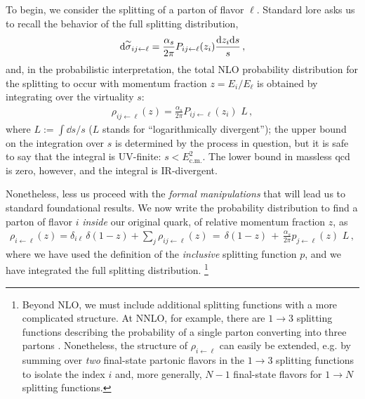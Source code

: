To begin, we consider the splitting of a parton of flavor \(\ell\).
%
Standard lore asks us to recall the behavior of the full splitting distribution,
\begin{align}
    \dd\overset{\sim}{\sigma}_{ij \leftarrow \ell}
    =
    \frac{\alpha_s}{2\pi}
    P_{ij \leftarrow \ell}(z_i) \frac{\dd z_i \dd s}{s}
    \,,
\end{align}
and, in the probabilistic interpretation, the total NLO probability distribution for the splitting to occur with momentum fraction \(z = E_i/E_\ell\) is obtained by integrating over the virtuality \(s\):
\begin{align}
    \rho_{ij \leftarrow \ell}(z)
    =
    \frac{\alpha_s}{2\pi}
    P_{ij \leftarrow \ell}(z_i)
    \,\,
    L
    \,,
\end{align}
where \(L := \int \dd s / s\) (\(L\) stands for ``logarithmically divergent'');
%
the upper bound on the integration over \(s\) is determined by the process in question, but it is safe to say that the integral is UV-finite:
%
\(s < E_\text{c.m.}^2\).
%
The lower bound in massless \gls{qcd} is zero, however, and the integral is IR-divergent.


Nonetheless, less us proceed with the \emph{formal manipulations} that will lead us to standard foundational results.
%
We now write the probability distribution to find a parton of flavor \(i\) \textit{inside} our original quark, of relative momentum fraction \(z\), as
\begin{align}
    \rho_{i \leftarrow \ell}(z)
    =
    \delta_{i\ell}
    \,
    \delta(1-z) + \sum_j \rho_{ij \leftarrow \ell}(z)
    \,
    =
    \,
    \delta(1-z)
    \,
    +
    \,
    \frac{\alpha_s}{2\pi}
    p_{j\leftarrow \ell}(z)
    \,\,
    L
    \,,
\end{align}
where we have used the definition of the \textit{inclusive} splitting function \(p\), and we have integrated the full splitting distribution.%
\footnote{
    Beyond NLO, we must include additional splitting functions with a more complicated structure.
    At NNLO, for example, there are \(1 \to 3\) splitting functions describing the probability of a single parton converting into three partons \cite{}.
    Nonetheless, the structure of \(\rho_{i\leftarrow \ell}\) can easily be extended, e.g. by summing over \emph{two} final-state partonic flavors in the \(1\to 3\) splitting functions to isolate the index \(i\) and, more generally, \(N-1\) final-state flavors for \(1\to N\) splitting functions.
}



